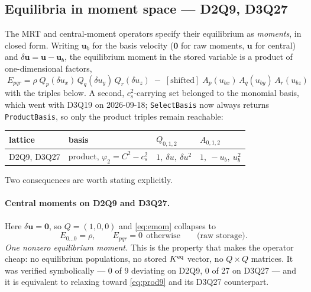 \documentclass[11pt,a4paper]{article}
\newcommand{\code}[1]{\texttt{\small #1}}
\newcommand{\cs}{c_s}
\newcommand{\uu}{\bm{u}}
\begin{document}
\subsection{Equilibria in moment space --- D2Q9, D3Q27}
\label{sec:eqmom}

The MRT and central-moment operators specify their equilibrium as \emph{moments},
in closed form. Writing $\uu_b$ for the basis velocity ($\bm0$ for raw moments,
$\uu$ for central) and $\delta\uu = \uu-\uu_b$, the equilibrium moment in the
stored variable is a product of one-dimensional factors,
\begin{equation}
  \boxed{\;
  E_{pqr} = \rho\;Q_p(\delta u_x)\,Q_q(\delta u_y)\,Q_r(\delta u_z)
   \;-\;[\text{shifted}]\;A_p(u_{bx})\,A_q(u_{by})\,A_r(u_{bz})\;}
  \label{eq:emom}
\end{equation}
with the triples below. A second, $\cs^2$-carrying set belonged to the monomial
basis, which went with D3Q19 on 2026-09-18; \code{SelectBasis} now always returns
\code{ProductBasis}, so only the product triples remain reachable:

\begin{center}\small
\begin{tabular}{llll}
\toprule
lattice & basis & $Q_{0,1,2}$ & $A_{0,1,2}$ \\
\midrule
D2Q9, D3Q27 & product, $\varphi_2=C^2-\cs^2$ &
  $1,\ \delta u,\ \delta u^2$ & $1,\ -u_b,\ u_b^2$ \\
\bottomrule
\end{tabular}
\end{center}

\noindent Two consequences are worth stating explicitly.

\paragraph{Central moments on D2Q9 and D3Q27.} Here $\delta\uu=\bm0$, so
$Q=(1,0,0)$ and \eqref{eq:emom} collapses to
\begin{equation}
  E_{0\ldots0} = \rho, \qquad E_{pqr} = 0 \ \ \text{otherwise}
  \qquad\text{(raw storage)} .
\end{equation}
\emph{One nonzero equilibrium moment.} This is the property that makes the
operator cheap: no equilibrium populations, no stored $K^{\rm eq}$ vector, no
$Q\times Q$ matrices. It was verified symbolically --- 0 of 9 deviating on D2Q9,
0 of 27 on D3Q27 --- and it is equivalent to relaxing toward \eqref{eq:prod9} and
its D3Q27 counterpart.
\end{document}
